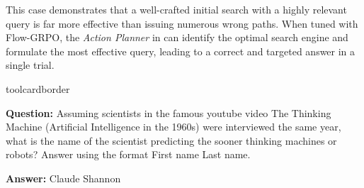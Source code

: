 This case demonstrates that a well-crafted initial search with a highly relevant query is far more effective than issuing numerous wrong paths. When tuned with Flow-GRPO, the \textit{Action Planner} in \model can identify the optimal search engine and formulate the most effective query, leading to a correct and targeted answer in a single trial.

\begin{custombox}[title=Example from \# GAIA]{toolcardborder}

\textbf{Question:} Assuming scientists in the famous youtube video The Thinking Machine (Artificial Intelligence in the 1960s) were interviewed the same year, what is the name of the scientist predicting the sooner thinking machines or robots? Answer using the format First name Last name.

\vspace{1em}

\textbf{Answer:} Claude Shannon
\end{custombox}


